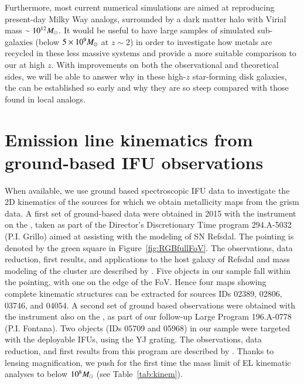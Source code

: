 Furthermore, most current numerical simulations are aimed at reproducing present-day Milky
Way analogs, surrounded by a dark matter halo with Virial mass $\sim10^{12}M_\odot$. It would
be useful to have large samples of simulated sub-\Lstar galaxies (\Mstar below
$5\times10^9M_\odot$ at $z\sim2$) in order to investigate how metals are recycled in these less
massive systems and provide a more suitable comparison to our \mgms at high $z$.  With
improvements on both the observational and theoretical sides, we will be able to answer why
in these high-$z$ star-forming disk galaxies, the \mgs can be established so early and why
they are so steep compared with those found in local analogs.


\setcounter{section}{0}
\renewcommand{\thesection}{\thechapter.\Alph{section}}

\section{Emission line kinematics from ground-based IFU observations}\label{sect:kinem}

When available, we use ground based spectroscopic IFU data
to investigate the 2D kinematics of the sources for which we obtain
metallicity maps from the \hst grism data.  A first
set of ground-based data were obtained in 2015 with the instrument
\muse on the \vlt, taken as part of the Director's Discretionary Time
program 294.A-5032 (P.I. Grillo) aimed at assisting
with the modeling of SN Refsdal.  The \muse pointing is denoted
by the green square in Figure~\ref{fig:RGBfullFoV}.  The observations,
data reduction, first results, and applications to the host galaxy of
Refsdal and mass modeling of the cluster are described by \citet{2016ApJ...822...78G,Karman:2016cg}.
Five objects in our \mg sample fall within the \muse pointing, with one on the edge of the FoV.
Hence four maps showing complete kinematic structures can be extracted for sources IDs 02389, 02806, 03746, and 04054.
A second set of ground based observations were obtained with the instrument \kmos also on the
\vlt, as part of our \glass follow-up \kmos Large Program 196.A-0778 (P.I. Fontana). Two objects (IDs 05709 and 05968) in our
sample were targeted with the deployable IFUs, using the YJ grating.
The observations, data reduction, and first results from this program are described by \citet{Mason:2016ww}.
Thanks to lensing magnification, we push for the first time the mass limit of EL kinematic analyses to below $10^8M_\odot$ (see Table~\ref{tab:kinem}).

